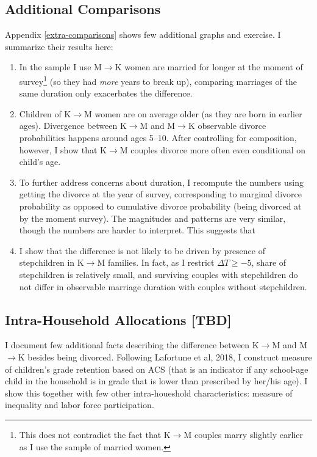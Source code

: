 \documentclass[12pt,letter]{article}
\begin{document}
\subsection{Additional Comparisons}

Appendix \ref{extra-comparisons} shows few additional graphs and exercise. I summarize their results here:
\begin{enumerate}
\item In the sample I use M$\to$K women are married for longer at the moment of survey\footnote{This does not contradict the fact that K$\to$M couples marry slightly earlier as I use the sample of married women.} (so they had \emph{more} years to break up), comparing marriages of the same duration only exacerbates the difference.
\item Children of K$\to$M women are on average older (as they are born in earlier ages). Divergence between K$\to$M and M$\to$K observable divorce probabilities happens around ages 5--10. After controlling for composition, however, I show that K$\to$M couples divorce more often even conditional on child's age.
\item To further address concerns about duration, I recompute the numbers using getting the divorce at the year of survey, corresponding to marginal divorce probability as opposed to cumulative divorce probability (being divorced at by the moment survey). The magnitudes and patterns are very similar, though the numbers are harder to interpret. This suggests that 
\item I show that the difference is not likely to be driven by presence of stepchildren in K$\to$M families. In fact, as I restrict $\Delta T \geq -5$, share of stepchildren is relatively small, and surviving couples with stepchildren do not differ in observable marriage duration with couples without stepchildren.
\end{enumerate}

\subsection{Intra-Household Allocations [TBD]}
I document few additional facts describing the difference between K$\to$M and M$\to$K besides being divorced. Following Lafortune et al, 2018, I construct measure of children's grade retention based on ACS (that is an indicator if any school-age child in the household is in grade that is lower than prescribed by her/his age). I show this together with few other intra-houeshold characteristics: measure of inequality and labor force participation. 
\end{document}
